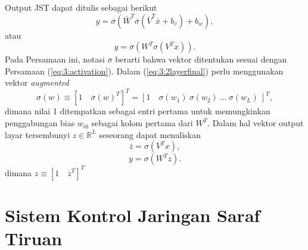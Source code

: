 \noindent Output JST dapat ditulis sebagai berikut
\begin{equation} \label{eq:3:2layer}
y = \overline{\sigma}
\left(
	\overline{W}^T\overline{\sigma}(\overline{V}^T\overline{x}+b_v)+b_w
\right),
\end{equation}
atau
\begin{equation} \label{eq:3:2layerfinal}
y = \overline{\sigma}
\left(
	W^T\sigma(V^Tx)
\right).
\end{equation}
Pada Persamaan ini, notasi $\overline{\sigma}$ berarti bahwa vektor ditentukan sesuai dengan Persamaan (\ref{eq:3:activation}). Dalam (\ref{eq:3:2layerfinal}) perlu menggunakan vektor \textit{augmented}
\begin{equation} \label{eq:3:augVector}
\sigma(w) \equiv [1\quad \overline{\sigma}(w)^T]^T = [1\quad \sigma(w_1)\ \sigma(w_2)\ \dots\ \sigma(w_L)\ ]^T,
\end{equation}
\noindent dimana nilai 1 ditempatkan sebagai entri pertama untuk memungkinkan penggabungan bias $w_{i0}$ sebagai kolom pertama dari $W^T$. Dalam hal vektor output layar tersembunyi $z\in \mathbb{R}^L$ seseorang dapat menuliskan
\begin{equation} \label{eq:3:final19}
\overline{z} = \sigma(V^Tx),
\end{equation}
\begin{equation} \label{eq:3:final20}
y = \sigma(W^Tz).
\end{equation}
\noindent dimana $z \equiv [1\quad \overline{z}^T]^T$

\section{Sistem Kontrol Jaringan Saraf Tiruan}


